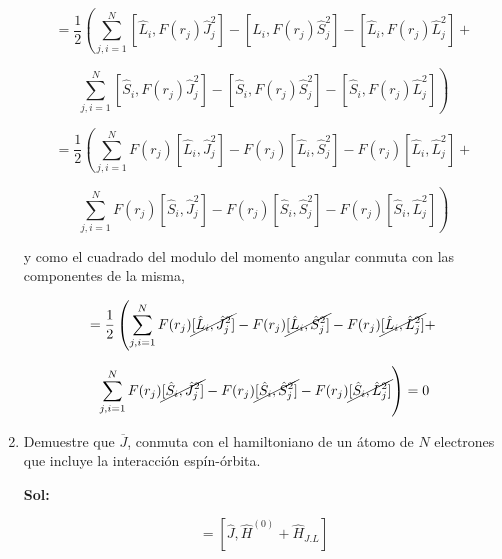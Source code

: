 \documentclass[12pt,a4paper]{article}
\begin{document}
\begin{enumerate}
\begin{equation*}
    = \frac{1}{2}\left(\sum_{j,i=1}^{N}[\hat{L}_i,F(r_j) \hat{J}_{j}^{2}] -[\hat{L}_i,F(r_j)\hat{S}_{j}^2] - [\hat{L}_i,F(r_j)\hat{L}_{j}^{2}] + \right.
\end{equation*}

\begin{equation*}
     \left.\sum_{j,i=1}^{N}[\hat{S}_i,F(r_j) \hat{J}_{j}^{2}] -[\hat{S}_i,F(r_j)\hat{S}_{j}^2] -[\hat{S}_i,F(r_j) \hat{L}_{j}^{2}]\right)
\end{equation*}

\begin{equation*}
    = \frac{1}{2}\left(\sum_{j,i=1}^{N}F(r_j)[\hat{L}_i, \hat{J}_{j}^{2}] -F(r_j)[\hat{L}_i,\hat{S}_{j}^2] - F(r_j)[\hat{L}_i,\hat{L}_{j}^{2}] + \right.
\end{equation*}

\begin{equation*}
     \left.\sum_{j,i=1}^{N}F(r_j)[\hat{S}_i, \hat{J}_{j}^{2}] -F(r_j)[\hat{S}_i,\hat{S}_{j}^2] -F(r_j)[\hat{S}_i, \hat{L}_{j}^{2}]\right)
\end{equation*}

y como el cuadrado del modulo del momento angular conmuta con las componentes de la misma,


\begin{equation*}
    [\hat{J}, \hat{H]_{J,L}}] = \frac{1}{2}\left(\sum_{j,i=1}^{N}F(r_j)\cancel{[\hat{L}_i, \hat{J}_{j}^{2}]} -F(r_j)\cancel{[\hat{L}_i,\hat{S}_{j}^2]}
    - F(r_j)\cancel{[\hat{L}_i,\hat{L}_{j}^{2}] }+ \right.
\end{equation*}

\begin{equation*}
     \left.\sum_{j,i=1}^{N}F(r_j)\cancel{[\hat{S}_i, \hat{J}_{j}^{2}]
     }-F(r_j)\cancel{[\hat{S}_i,\hat{S}_{j}^2]} -F(r_j)\cancel{[\hat{S}_i, \hat{L}_{j}^{2}]}\right) = 0
\end{equation*}







\item Demuestre que $\overline{J}$, conmuta con el hamiltoniano de un átomo de $N$ electrones que incluye la interacción espín-órbita.

\textbf{Sol:}

\begin{equation*}
    [\hat{J},\hat{H}]= [\hat{J}, \hat{H}^{(0)} + \hat{H}_{J.L}]
\end{equation*}


\end{enumerate}
\end{document}
